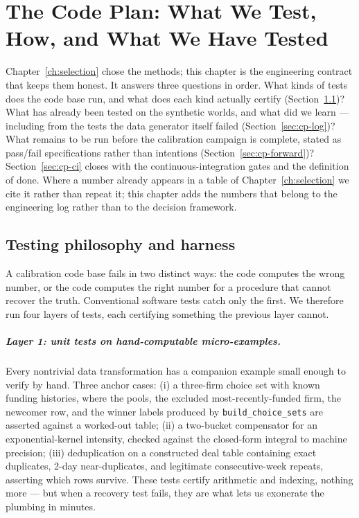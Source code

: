 \chapter{The Code Plan: What We Test, How, and What We Have Tested}
\label{ch:codeplan}

Chapter~\ref{ch:selection} chose the methods; this chapter is the engineering contract that keeps them
honest. It answers three questions in order. What kinds of tests does the code base run, and what does each
kind actually certify (Section~\ref{sec:cp-harness})? What has already been tested on the synthetic worlds,
and what did we learn --- including from the tests the data generator itself failed
(Section~\ref{sec:cp-log})? What remains to be run before the calibration campaign is complete, stated as
pass/fail specifications rather than intentions (Section~\ref{sec:cp-forward})? Section~\ref{sec:cp-ci}
closes with the continuous-integration gates and the definition of done. Where a number already appears in a
table of Chapter~\ref{ch:selection} we cite it rather than repeat it; this chapter adds the numbers that
belong to the engineering log rather than to the decision framework.

\section{Testing philosophy and harness}
\label{sec:cp-harness}

A calibration code base fails in two distinct ways: the code computes the wrong number, or the code computes
the right number for a procedure that cannot recover the truth. Conventional software tests catch only the
first. We therefore run four layers of tests, each certifying something the previous layer cannot.

\paragraph{Layer 1: unit tests on hand-computable micro-examples.} Every nontrivial data transformation has
a companion example small enough to verify by hand. Three anchor cases: (i) a three-firm choice set with
known funding histories, where the pools, the excluded most-recently-funded firm, the newcomer row, and the
winner labels produced by \texttt{build\_choice\_sets} are asserted against a worked-out table; (ii) a
two-bucket compensator for an exponential-kernel intensity, checked against the closed-form integral to
machine precision; (iii) deduplication on a constructed deal table containing exact duplicates, 2-day
near-duplicates, and legitimate consecutive-week repeats, asserting which rows survive. These tests certify
arithmetic and indexing, nothing more --- but when a recovery test fails, they are what lets us exonerate the
plumbing in minutes.

